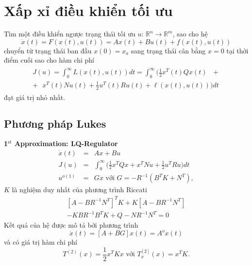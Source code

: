 \documentclass[11pt]{beamer}
\begin{document}
\section{Xấp xỉ điều khiển tối ưu}

\begin{frame}
		Tìm một điều khiển ngược trạng thái tối ưu  $u$: $\mathbb{R}^n \to \mathbb{R}^m$, sao cho hệ \begin{equation}
			\dot{x}(t) = F(x(t), u(t)) = Ax(t) + Bu(t) + f(x(t), u(t))
		\end{equation} chuyển từ trạng thái ban đầu $x(0) = x_a$ sang trạng thái cân bằng $x = 0$ tại thời điểm cuối sao cho hàm chi phí \begin{eqnarray}
	\begin{split}
	J(u) = \int_{0}^{\infty}L(x(t), u(t))dt 
	= \int_{0}^{\infty}\Big(\frac{1}{2}x^T(t)Qx(t) \text{ }+ \\+ \text{ } x^T(t)Nu(t) + \frac{1}{2}u^T(t)Ru(t) + \ell(x(t), u(t)) \Big)dt  
	\end{split}
	\end{eqnarray} đạt giá trị nhỏ nhất.
\end{frame}

\subsection{Phương pháp Lukes}

\begin{frame}
	\textbf{1$^\text{st}$ Approximation: LQ-Regulator} \begin{eqnarray}
	\dot{x}(t) &=& Ax + Bu \nonumber \\
	J(u) &=& \int_{0}^{\infty}\bigg(\frac{1}{2}x^TQx + x^TNu + \frac{1}{2}u^TRu\bigg)dt \nonumber \\ u^{o(1)} &=& Gx \text{ với } G = -R^{-1}(B^TK + N^T), \nonumber
	\end{eqnarray} $K$ là nghiệm duy nhất của phương trình Riccati 
	\begin{equation}
	\begin{split}
		[A-BR^{-1}N^T]^TK + K[A-BR^{-1}N^T] \\- KBR^{-1}B^TK + Q - NR^{-1}N^T = 0
	\end{split}
	\end{equation}
	Kết quả của hệ được mô tả bởi phương trình \begin{equation}
		\dot{x}(t) = [A + BG]x(t) = A^ox(t)
	\end{equation} và có giá trị hàm chi phí
	\begin{equation}
		T^{(2)}(x) = \frac{1}{2}x^TKx \text{ với } T_x^{[2]}(x) = x^TK.
	\end{equation} 
\end{frame}
\end{document}
